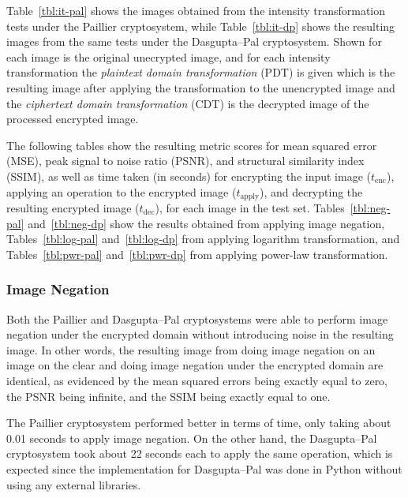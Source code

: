 Table~\ref{tbl:it-pal} shows the images obtained from the intensity transformation tests under the Paillier cryptosystem, while Table~\ref{tbl:it-dp} shows the resulting images from the same tests under the Dasgupta--Pal cryptosystem. Shown for each image is the original unecrypted image, and for each intensity transformation the \textit{plaintext domain transformation} (PDT) is given which is the resulting image after applying the transformation to the unencrypted image and the \textit{ciphertext domain transformation} (CDT) is the decrypted image of the processed encrypted image.

The following tables show the resulting metric scores for mean squared error (MSE), peak signal to noise ratio (PSNR), and structural similarity index (SSIM), as well as time taken (in seconds) for encrypting the input image ($t_\text{enc}$), applying an operation to the encrypted image ($t_\text{apply}$), and decrypting the resulting encrypted image ($t_\text{dec}$), for each image in the test set. Tables~\ref{tbl:neg-pal} and~\ref{tbl:neg-dp} show the results obtained from applying image negation, Tables~\ref{tbl:log-pal} and~\ref{tbl:log-dp} from applying logarithm transformation, and Tables~\ref{tbl:pwr-pal} and~\ref{tbl:pwr-dp} from applying power-law transformation.

\subsubsection{Image Negation}
Both the Paillier and Dasgupta--Pal cryptosystems were able to perform image negation under the encrypted domain without introducing noise in the resulting image. In other words, the resulting image from doing image negation on an image on the clear and doing image negation under the encrypted domain are identical, as evidenced by the mean squared errors being exactly equal to zero, the PSNR being infinite, and the SSIM being exactly equal to one.

The Paillier cryptosystem performed better in terms of time, only taking about 0.01 seconds to apply image negation. On the other hand, the Dasgupta--Pal cryptosystem took about 22 seconds each to apply the same operation, which is expected since the implementation for Dasgupta--Pal was done in Python without using any external libraries.

